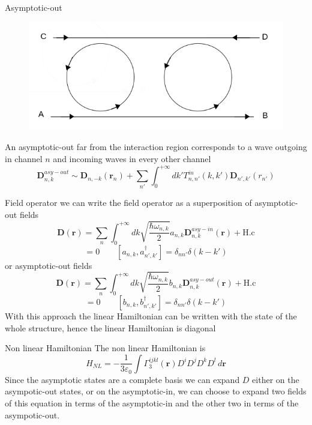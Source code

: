 \documentclass{beamer}
\renewcommand{\r}{\mathbf{r}}
\begin{document}
\begin{frame}[plain]{Asymptotic-out}
\begin{figure}
\centering
\includegraphics[width = .5\textwidth]{Asyoutb2}
\end{figure}
An asymptotic-out far from the interaction region corresponds to a wave outgoing in channel $n$ and incoming waves in every other channel
\begin{equation}\label{asyout}\mathbf{D}^{asy-out}_{n,k} \sim \mathbf{D}_{n,-k}(\r_n) + \sum_{n'}\int_{0}^{+\infty}dk' T^{in}_{n,n'}(k,k')\mathbf{D}_{n',k'}(r_{n'})
\end{equation} 

\end{frame}



\begin{frame}[plain]{Field operator}
we can write the field operator as a superposition of asymptotic-out fields
\begin{equation}\mathbf{D}(\r) = \sum_n \int_{0}^{+\infty}dk \sqrt{\frac{\hbar \omega_{n,k}}{2}}a_{n,k}\mathbf{D}_{n,k}^{asy-in}(\r) + \text{H.c}\end{equation}
\begin{equation}[a_{n,k},a_{n',k'}] = 0 \qquad [a_{n,k},a_{n',k'}^\dagger] = \delta_{nn'}\delta(k-k')\end{equation}
or asymptotic-out fields
\begin{equation}\label{dasyout}\mathbf{D}(\r) = \sum_n \int_{0}^{+\infty}dk \sqrt{\frac{\hbar \omega_{n,k}}{2}}b_{n,k}\mathbf{D}_{n,k}^{asy-out}(\r) + \text{H.c}\end{equation}
\begin{equation}[b_{n,k},b_{n',k'}] = 0 \qquad [b_{n,k},b_{n',k'}^\dagger] = \delta_{nn'}\delta(k-k')\end{equation}
With this approach the linear Hamiltonian can be written with the state of the whole structure, hence the linear Hamiltonian is diagonal
\end{frame}


\begin{frame}[plain]{Non linear Hamiltonian}
The non linear Hamiltonian is 
\begin{equation}H_{NL} = -\frac{1}{3\varepsilon_0}\int\Gamma^{ijkl}_3(\r)D^iD^jD^kD^l\,d\r\end{equation}
Since the asymptotic states are a complete basis we can expand $D$ either on the asympotic-out states, or on the asymptotic-in, we can choose to expand two fields of this equation in terms of the asymptotic-in and the other two in terms of the asympotic-out.
\end{frame}
\end{document}
